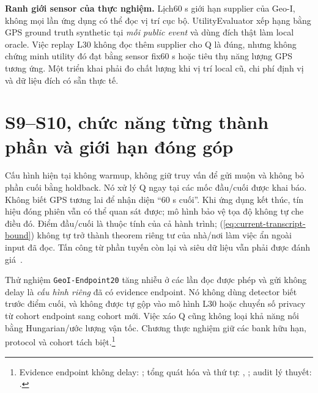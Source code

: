 \textbf{Ranh giới sensor của thực nghiệm.} Lịch60 s giới hạn supplier của Geo-I, không mọi lần ứng dụng có thể đọc vị trí cục bộ. UtilityEvaluator xếp hạng bằng GPS ground truth synthetic tại \emph{mỗi public event} và dùng đích thật làm local oracle. Việc replay L30 không đọc thêm supplier cho Q là đúng, nhưng không chứng minh utility đó đạt bằng sensor fix60 s hoặc tiêu thụ năng lượng GPS tương ứng. Một triển khai phải đo chất lượng khi vị trí local cũ, chi phí định vị và dữ liệu đích có sẵn thực tế.






\section{S9--S10, chức năng từng thành phần và giới hạn đóng góp}
\label{sec:current-endpoints-contribution}

Cấu hình hiện tại không warmup, không giữ truy vấn để gửi muộn và không bỏ phần cuối bằng holdback. Nó xử lý Q ngay tại các mốc đầu/cuối được khai báo. Không biết GPS tương lai để nhận diện ``60 s cuối''. Khi ứng dụng kết thúc, tín hiệu đóng phiên vẫn có thể quan sát được; mô hình bảo vệ tọa độ không tự che điều đó. Điểm đầu/cuối là thuộc tính của cả hành trình; (\ref{eq:current-transcript-bound}) không tự trở thành theorem riêng tư của nhà/nơi làm việc ẩn ngoài input đã đọc. Tấn công từ phần tuyến còn lại và siêu dữ liệu vẫn phải được đánh giá~\cite{dhondt2022endpoint}.

Thử nghiệm \texttt{GeoI-Endpoint20} tăng nhiễu ở các lần đọc được phép và gửi không delay là \emph{cấu hình riêng} đã có evidence endpoint. Nó không dùng detector biết trước điểm cuối, và không được tự gộp vào mô hình L30 hoặc chuyển số privacy từ cohort endpoint sang cohort mới. Việc xáo Q cũng không loại khả năng nối bằng Hungarian/ước lượng vận tốc. Chương thực nghiệm giữ các bank hữu hạn, protocol và cohort tách biệt.\footnote{Evidence endpoint không delay: ; tổng quát hóa và thứ tự: , ; audit lý thuyết: .}

